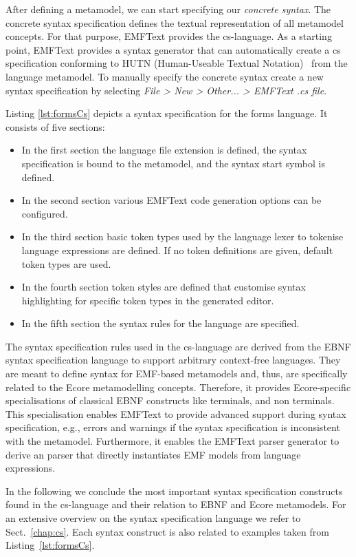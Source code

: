 	After defining a metamodel, we can start specifying our
	\emph{concrete syntax}. The concrete syntax specification defines 
	the textual representation of all metamodel
	concepts. For that purpose, EMFText provides the cs-language. 
	As a starting point, EMFText provides a syntax generator that can
	automatically create a cs specification conforming to HUTN (Human-Useable
	Textual Notation)~\cite{HUTN} from the language metamodel. 
	To manually specify the concrete syntax create a
	new syntax specification by selecting \emph{File > New > Other... > EMFText .cs
	file}.

	\noindent Listing \ref{lst:formsCs} depicts a syntax specification for the forms
	language. It consists of five sections: 
	\begin{itemize}
	  \item In the first section the language file
		extension is defined, the syntax specification is bound to the metamodel, 
		and the syntax start symbol is defined.
	  \item In the second section various EMFText code generation options can be
	  	configured.
	  \item  In the third section basic token types used by the language
	  	lexer to tokenise language expressions are defined. If no token definitions
	 	are given, default token types are used. 	
	  \item In the fourth section token styles are defined that customise syntax
	  	highlighting for specific token types in the generated editor.
	  \item In the fifth section the syntax rules for the language are specified.	
	\end{itemize}
	
		The syntax specification rules used in the cs-language are derived from the
		EBNF syntax specification language to support arbitrary context-free languages.
		They are meant to define syntax for EMF-based metamodels and, thus, are
		specifically related to the Ecore metamodelling concepts. Therefore, it provides
		Ecore-specific specialisations of classical EBNF constructs like terminals, and
		non terminals. This specialisation enables EMFText to provide advanced support 
		during syntax specification, e.g., errors and warnings if the syntax
		specification is inconsistent with the metamodel. Furthermore, it enables the
		EMFText parser generator to derive an parser that directly instantiates EMF
		models from language expressions.


	In the following we conclude the most important syntax specification
	constructs found in the cs-language and their relation to EBNF and Ecore
	metamodels. For an extensive overview on the syntax specification language we
	refer to Sect.~\ref{chap:cs}. Each syntax construct is also related to examples
	taken from Listing~\ref{lst:formsCs}.

